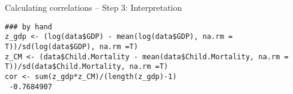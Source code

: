\documentclass[presentation]{beamer}
\begin{document}
\begin{frame}[fragile,shrink=45,label={sec:org73f47a1}]{Calculating correlations -- Step 3: Interpretation}
 \begin{verbatim}
### by hand
z_gdp <- (log(data$GDP) - mean(log(data$GDP), na.rm = T))/sd(log(data$GDP), na.rm =T)
z_CM <- (data$Child.Mortality - mean(data$Child.Mortality, na.rm = T))/sd(data$Child.Mortality, na.rm =T)
cor <- sum(z_gdp*z_CM)/(length(z_gdp)-1)
 -0.7684907
\end{verbatim}
\end{frame}
\end{document}
